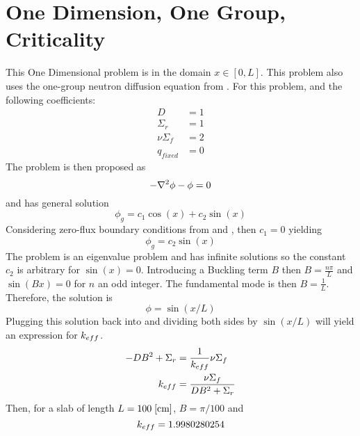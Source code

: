 \section{One Dimension, One Group, Criticality} 
  \label{sec:deriv_1d1g}
  This One Dimensional problem is in the domain $x \in [0,L]$.
  This problem also uses the one-group neutron diffusion equation from 
  . For this problem, and the following coefficients:
  \begin{align*}
    D &= 1\\
    \Sigma_r &= 1\\
    \nu \Sigma_f &= 2\\
    q_{fixed} &= 0
  \end{align*}
  The problem is then proposed as 
  \begin{equation}
    -\mathbf{\nabla}^2 \phi - \phi = 0 
  \end{equation}
  and has general solution
  \begin{equation} \label{eq:critical_general}
    \phi_g = c_1 \cos(x) + c_2 \sin(x)
  \end{equation}
  Considering zero-flux boundary conditions from  and 
  , then $c_1 = 0 $ yielding
  \begin{equation} \label{eq:sinshape}
    \phi_g = c_2 \sin(x)
  \end{equation}
  The problem is an eigenvalue problem and has infinite solutions so the 
  constant $c_2$ is arbitrary for $\sin(x)=0$. Introducing a Buckling term $B$
  then $B=\frac{n \pi}{L}$ and $\sin(Bx)=0$ for $n$ an odd integer. The 
  fundamental mode is then $B=\frac{1}{L}$. Therefore, the solution is 
  \begin{equation} \label{eq:analytic_1d1g}
    \phi = \sin(x/L)
  \end{equation}
  Plugging this solution back into  and dividing both sides
  by $\sin(x/L)$ will yield an expression for $k_{eff}$.
  \begin{align}
    -D B^2 + \Sigma_r &= \frac{1}{k_{eff}} \nu \Sigma_f \\
    k_{eff} &= \frac{\nu \Sigma_f}{DB^2 + \Sigma_r} \label{eq:keff1d}
  \end{align}
  Then, for a slab of length $ L = 100 \;\text{[{cm}]} $, $B = \pi / 100$ and
  \begin{equation}
    k_{eff} = 1.9980280254
  \end{equation}
  
